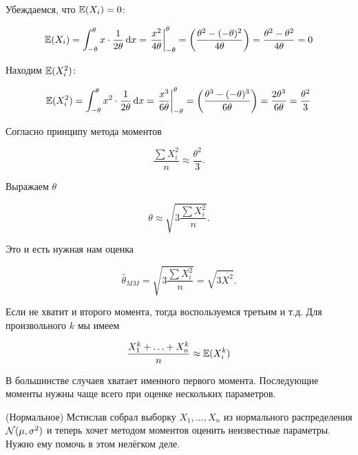 \documentclass[12pt, a4paper, oneside]{article}
\begin{document}
\begin{sol}
Убеждаемся, что $\mathbb{E}(X_{i})=0$:

\[  \mathbb{E}(X_{i}) = \int _{-\theta}^{\theta} x \cdot \frac{1}{2\theta} \,\mathrm{d}x = \left. \frac{x^2}{4 \theta} \right|_{-\theta}^{\theta} = \left( \frac{\theta^2 - (-\theta)^2 }{4 \theta}  \right) =  \frac{\theta^{2} - \theta^{2}}{4 \theta} = 0  \]

Находим $ \mathbb{E}(X_{i}^{2}) $:

\[  \mathbb{E}(X_{i}^{2}) = \int _{-\theta}^{\theta} x^{2} \cdot \frac{1}{2\theta}  \,\mathrm{d}x = \left. \frac{x^3}{6 \theta} \right|_{-\theta}^{\theta} = \left( \frac{\theta^3 - (-\theta)^3 }{6\theta}  \right) = \frac{2 \theta^{3}}{6\theta}  = \frac{\theta^{2}}{3}  \]

Согласно принципу метода моментов

\[ \frac{\sum X_{i}^{2}}{n} \approx \frac{\theta^{2}}{3}.\]

Выражаем $ \theta $

\[ \theta\approx \sqrt{3\frac{\sum X_{i}^{2}}{n} }.\]

Это и есть нужная нам оценка

\[ \hat{\theta}_{MM}= \sqrt{3\frac{\sum X_{i}^{2}}{n} } = \sqrt{3 \overline{X^2 } }.\]
\end{sol}

Если не хватит и второго момента, тогда воспользуемся третьим и т.д. Для произвольного $k$ мы имеем

\[ \frac{X_{1}^{k} + \ldots + X_{n}^{k}}{n} \approx \mathbb{E}(X_{i}^{k})\]

В большинстве случаев хватает именного первого момента. Последующие моменты нужны чаще всего при оценке нескольких параметров.

\begin{problem}{(Нормальное)}
Мстислав собрал выборку $X_1, \ldots, X_n$ из нормального распределения $\mathcal{N}(\mu, \sigma^2)$ и теперь хочет методом моментов оценить неизвестные параметры. Нужно ему помочь в этом нелёгком деле.
\end{problem}
\end{document}
